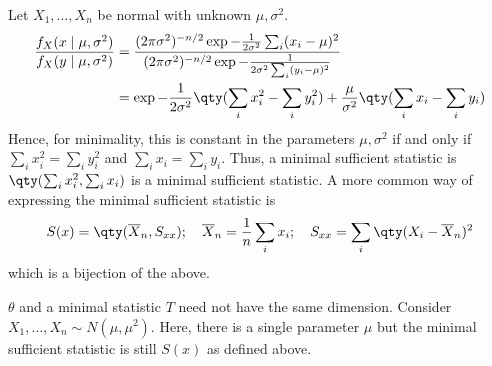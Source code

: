 \begin{example}
	Let $X_1, \dots, X_n$ be normal with unknown $\mu, \sigma^2$.
	\begin{align*}
		\frac{f_X(x \mid \mu, \sigma^2)}{f_X(y \mid \mu, \sigma^2)} & = \frac{(2 \pi \sigma^2)^{-n/2} \exp{-\frac{1}{2\sigma^2} \sum_i (x_i - \mu)^2}}{(2 \pi \sigma^2)^{-n/2} \exp{-\frac{1}{2\sigma^2 \sum_i (y_i - \mu)^2}}} \\
		& = \exp{-\frac{1}{2\sigma^2} \qty(\sum_i x_i^2 - \sum_i y_i^2) + \frac{\mu}{\sigma^2} \qty(\sum_i x_i - \sum_i y_i)}
	\end{align*}
	Hence, for minimality, this is constant in the parameters $\mu, \sigma^2$ if and only if $\sum_i x_i^2 = \sum_i y_i^2$ and $\sum_i x_i = \sum_i y_i$.
	Thus, a minimal sufficient statistic is $\qty(\sum_i x_i^2, \sum_i x_i)$ is a minimal sufficient statistic.
	A more common way of expressing the minimal sufficient statistic is
	\begin{align*}
		S(x) = \qty(\overline X_n, S_{xx});\quad \overline X_n = \frac{1}{n} \sum_i x_i;\quad S_{xx} = \sum_i \qty(X_i - \overline X_n)^2
	\end{align*}
	which is a bijection of the above.
\end{example}
\begin{example}
	$\theta$ and a minimal statistic $T$ need not have the same dimension.
	Consider $X_1, \dots, X_n \sim N(\mu, \mu^2)$.
	Here, there is a single parameter $\mu$ but the minimal sufficient statistic is still $S(x)$ as defined above.
\end{example}

